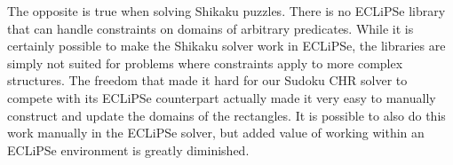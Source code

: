 \documentclass[a4paper,10pt]{article}
\begin{document}
The opposite is true when solving Shikaku puzzles. There is no ECLiPSe library that can handle constraints on domains of arbitrary predicates. While it is certainly possible to make the Shikaku solver work in ECLiPSe, the libraries are simply not suited for problems where constraints apply to more complex structures. The freedom that made it hard for our Sudoku CHR solver to compete with its ECLiPSe counterpart actually made it very easy to manually construct and update the domains of the rectangles. It is possible to also do this work manually in the ECLiPSe solver, but added value of working within an ECLiPSe environment is greatly diminished.

 

\end{document}
